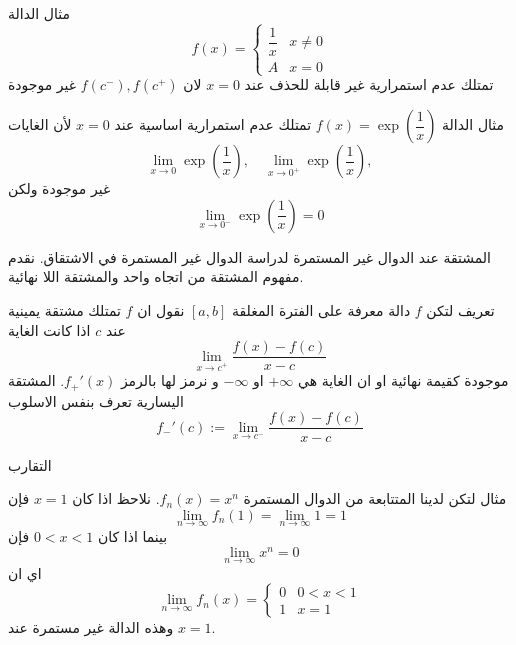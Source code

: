 	\begin{frame}
		\begin{exampleblock}{مثال}
				الدالة
			\[
			f(x) =
			\begin{cases}
				\dfrac{1}{x}& x\neq0 \\
				A & x=0
			\end{cases}
			\]
			تمتلك عدم استمرارية غير قابلة للحذف عند $x=0$ لان $f(c^-), f(c^+)$ غير موجودة
		\end{exampleblock}
		
		\pause
		\begin{exampleblock}{مثال}
				الدالة $f(x) = \exp\left(\dfrac{1}{x}\right)$ تمتلك عدم استمرارية اساسية عند $x=0$ لأن الغايات
			\[
			\lim\limits_{x\to 0} \exp\left(\frac{1}{x}\right), \quad 	\lim\limits_{x\to 0^+} \exp\left(\frac{1}{x}\right), 
			\]
			غير موجودة ولكن 
			\[
			\lim\limits_{x\to 0^-} \exp\left(\frac{1}{x}\right) = 0
			\]
		\end{exampleblock}
	\end{frame}
	
	\begin{frame}{المشتقة عند الدوال غير المستمرة}
		لدراسة الدوال غير المستمرة في الاشتقاق. نقدم مفهوم المشتقة من اتجاه واحد والمشتقة اللا نهائية.
		\begin{exampleblock}{تعريف}
				لتكن $f$ دالة معرفة على الفترة المغلقة $[a, b]$ نقول ان $f$ تمتلك مشتقة يمينية عند $c$ اذا كانت الغاية 
			\[
			\lim\limits_{x\to c^+} \frac{f(x) - f(c)}{x-c}
			\]
			موجودة كقيمة نهائية او ان الغاية هي $+\infty$ او $-\infty$ و نرمز لها بالرمز $f_+'(x)$. المشتقة اليسارية تعرف بنفس الاسلوب
			\[
			f_-'(c):=	\lim\limits_{x\to c^-} \frac{f(x) - f(c)}{x-c}
			\]
		\end{exampleblock}
	\end{frame}
	
	\begin{frame}{التقارب}
		\begin{exampleblock}{مثال}
			لتكن لدينا المتتابعة من الدوال المستمرة $f_n(x) = x^n$. نلاحظ اذا كان $x=1$ فإن
			\[
			\lim\limits_{n\to \infty} f_n(1) = \lim\limits_{n\to \infty} 1 =1
			\]
			بينما اذا كان $0<x<1$ فإن 
			\[
			\lim\limits_{n\to \infty} x^n = 0
			\]
		اي ان 
		\[
		\lim\limits_{n\to \infty} f_n(x) = 
		\begin{cases}
			0 & 0 <x< 1  \\
			1 & x=1
		\end{cases}
		\]
		وهذه الدالة غير مستمرة عند $x=1$.
		
\end{exampleblock} 
	\end{frame}
	

